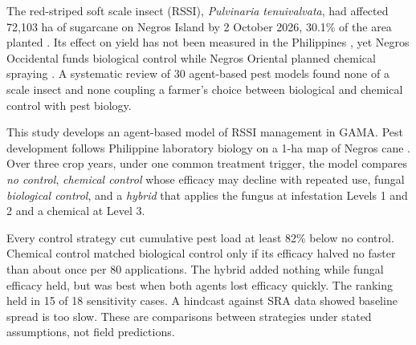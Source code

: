 The red-striped soft scale insect (RSSI), \emph{Pulvinaria tenuivalvata}, had affected 72,103 ha of sugarcane on Negros Island by 2 October 2026, 30.1\% of the area planted \citep{SRA2026FOI}. Its effect on yield has not been measured in the Philippines \citep{Guerrero2024}, yet Negros Occidental funds biological control \citep{Bayoran2026} while Negros Oriental planned chemical spraying \citep{Partlow2026}. A systematic review of 30 agent-based pest models found none of a scale insect and none coupling a farmer's choice between biological and chemical control with pest biology.

This study develops an agent-based model of RSSI management in GAMA. Pest development follows Philippine laboratory biology \citep{Guerrero2026} on a 1-ha map of Negros cane \citep{DiTommaso2024}. Over three crop years, under one common treatment trigger, the model compares \emph{no control}, \emph{chemical control} whose efficacy may decline with repeated use, fungal \emph{biological control}, and a \emph{hybrid} that applies the fungus at infestation Levels 1 and 2 and a chemical at Level 3.

Every control strategy cut cumulative pest load at least 82\% below no control. Chemical control matched biological control only if its efficacy halved no faster than about once per 80 applications. The hybrid added nothing while fungal efficacy held, but was best when both agents lost efficacy quickly. The ranking held in 15 of 18 sensitivity cases. A hindcast against SRA data showed baseline spread is too slow. These are comparisons between strategies under stated assumptions, not field predictions.
